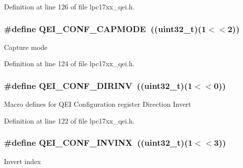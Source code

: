 \-Definition at line 126 of file lpc17xx\-\_\-qei.\-h.

\hypertarget{group___q_e_i___private___macros_gae5d377ec1ce7e14b0c74cca1cbb0f758}{
\subsubsection[{\-Q\-E\-I\-\_\-\-C\-O\-N\-F\-\_\-\-C\-A\-P\-M\-O\-D\-E}]{\setlength{\rightskip}{0pt plus 5cm}\#define {\bf \-Q\-E\-I\-\_\-\-C\-O\-N\-F\-\_\-\-C\-A\-P\-M\-O\-D\-E}~((uint32\-\_\-t)(1$<$$<$2))}}\label{group___q_e_i___private___macros_gae5d377ec1ce7e14b0c74cca1cbb0f758}
\-Capture mode 

\-Definition at line 124 of file lpc17xx\-\_\-qei.\-h.

\hypertarget{group___q_e_i___private___macros_ga616a23b4f2453b4934c19f162d7c8fba}{
\subsubsection[{\-Q\-E\-I\-\_\-\-C\-O\-N\-F\-\_\-\-D\-I\-R\-I\-N\-V}]{\setlength{\rightskip}{0pt plus 5cm}\#define {\bf \-Q\-E\-I\-\_\-\-C\-O\-N\-F\-\_\-\-D\-I\-R\-I\-N\-V}~((uint32\-\_\-t)(1$<$$<$0))}}\label{group___q_e_i___private___macros_ga616a23b4f2453b4934c19f162d7c8fba}
\-Macro defines for \-Q\-E\-I \-Configuration register \-Direction \-Invert 

\-Definition at line 122 of file lpc17xx\-\_\-qei.\-h.

\hypertarget{group___q_e_i___private___macros_ga1e8ac3c6d37ff0b361f1353f037789f3}{
\subsubsection[{\-Q\-E\-I\-\_\-\-C\-O\-N\-F\-\_\-\-I\-N\-V\-I\-N\-X}]{\setlength{\rightskip}{0pt plus 5cm}\#define {\bf \-Q\-E\-I\-\_\-\-C\-O\-N\-F\-\_\-\-I\-N\-V\-I\-N\-X}~((uint32\-\_\-t)(1$<$$<$3))}}\label{group___q_e_i___private___macros_ga1e8ac3c6d37ff0b361f1353f037789f3}
\-Invert index 

